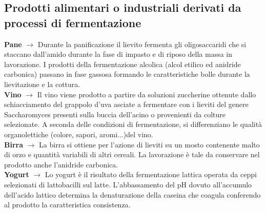 \subsection{Prodotti alimentari o industriali derivati da processi di fermentazione}
\textbf{Pane} $\xrightarrow{}$ Durante la panificazione il lievito fermenta gli oligosaccaridi che si staccano dall'amido durante la fase di impasto e di riposo della massa in lavorazione. I prodotti della fermentazione alcolica (alcol etilico ed anidride carbonica) passano in fase gassosa formando le caratteristiche bolle durante la lievitazione e la cottura.
\\\textbf{Vino} $\xrightarrow{}$ Il vino viene prodotto a partire da soluzioni zuccherine ottenute dallo schiacciamento del grappolo d'uva asciate a fermentare con i lieviti del genere Saccharomyces presenti sulla buccia dell'acino o provenienti da colture selezionate. A seconda delle condizioni di fermentazione, si differenziano le qualit\`a organolettiche (colore, sapori, aromi...)del vino.
\\\textbf{Birra} $\xrightarrow{}$ La birra si ottiene per l'azione di lieviti su un mosto contenente malto di orzo e quantit\`a variabili di altri cereali. La lavorazione \`e tale da conservare nel prodotto anche l'anidride carbonica.
\\\textbf{Yogurt} $\xrightarrow{}$ Lo yogurt \`e il risultato della fermentazione lattica operata da ceppi selezionati di lattobacilli sul latte. L'abbassamento del pH dovuto all'accumulo dell'acido lattico determina la denaturazione della caseina che coagula conferendo al prodotto la caratteristica consistenza.
